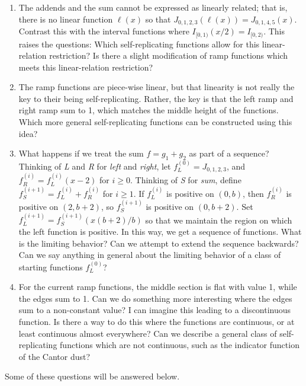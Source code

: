 \documentclass[20pt,]{extarticle}
\providecommand{\tightlist}{%
  \setlength{\itemsep}{0pt}\setlength{\parskip}{0pt}}
\begin{document}
\begin{enumerate}
\def\labelenumi{\arabic{enumi}.}
\tightlist
\item
  The addends and the sum cannot be expressed as linearly related; that
  is, there is no linear function \(\ell(x)\) so that
  \(J_{0, 1, 2, 3}(\ell(x)) = J_{0, 1, 4, 5}(x)\). Contrast this with
  the interval functions where \(I_{[0, 1)}(x / 2) = I_{[0, 2)}\). This
  raises the questions: Which self-replicating functions allow for this
  linear-relation restriction? Is there a slight modification of ramp
  functions which meets this linear-relation restriction?
\item
  The ramp functions are piece-wise linear, but that linearity is not
  really the key to their being self-replicating. Rather, the key is
  that the left ramp and right ramp sum to 1, which matches the middle
  height of the functions. Which more general self-replicating functions
  can be constructed using this idea?
\item
  What happens if we treat the sum \(f = g_1 + g_2\) as part of a
  sequence? Thinking of \emph{L} and \emph{R} for \emph{left} and
  \emph{right}, let \(f^{(0)}_L = J_{0, 1, 2, 3}\), and
  \(f^{(i)}_R = f^{(i)}_L(x-2)\) for \(i \ge 0\). Thinking of \emph{S}
  for \emph{sum}, define \(f^{(i+1)}_S = f^{(i)}_L + f^{(i)}_R\) for
  \(i \ge 1\). If \(f^{(i)}_L\) is positive on \((0, b)\), then
  \(f^{(i)}_R\) is positive on \((2, b + 2)\), so \(f^{(i+1)}_S\) is
  positive on \((0, b + 2)\). Set
  \(f^{(i+1)}_L = f^{(i+1)}_S(x (b + 2) / b)\) so that we maintain the
  region on which the left function is positive. In this way, we get a
  sequence of functions. What is the limiting behavior? Can we attempt
  to extend the sequence backwards? Can we say anything in general about
  the limiting behavior of a class of starting functions \(f^{(0)}_L\)?
\item
  For the current ramp functions, the middle section is flat with value
  1, while the edges sum to 1. Can we do something more interesting
  where the edges sum to a non-constant value? I can imagine this
  leading to a discontinuous function. Is there a way to do this where
  the functions are continuous, or at least continuous almost
  everywhere? Can we describe a general class of self-replicating
  functions which are not continuous, such as the indicator function of
  the Cantor dust?
\end{enumerate}

Some of these questions will be answered below.
\end{document}
